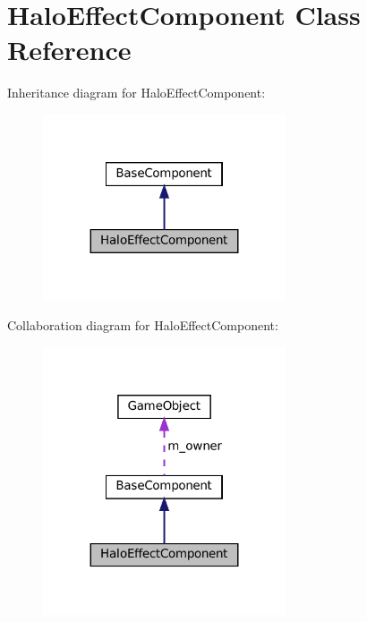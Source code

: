 \hypertarget{classHaloEffectComponent}{}\section{Halo\+Effect\+Component Class Reference}
\label{classHaloEffectComponent}


Inheritance diagram for Halo\+Effect\+Component\+:\nopagebreak
\begin{figure}[H]
\begin{center}
\leavevmode
\includegraphics[width=203pt]{classHaloEffectComponent__inherit__graph}
\end{center}
\end{figure}


Collaboration diagram for Halo\+Effect\+Component\+:\nopagebreak
\begin{figure}[H]
\begin{center}
\leavevmode
\includegraphics[width=203pt]{classHaloEffectComponent__coll__graph}
\end{center}
\end{figure}
